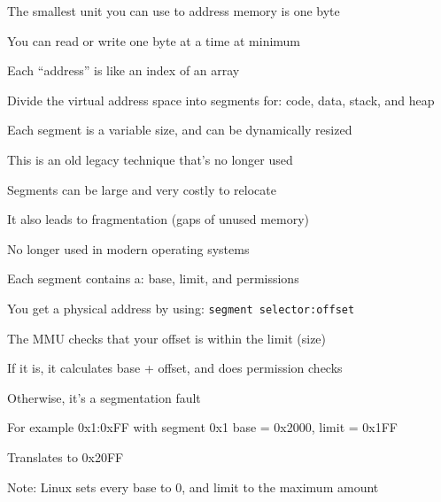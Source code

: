 \begin{slide}


    The smallest unit you can use to address memory is one byte
    \medskip

    You can read or write one byte at a time at minimum
    \medskip

    Each ``address'' is like an index of an array

\end{slide}

\begin{slide}


    Divide the virtual address space into segments for: code, data, stack, and heap


    Each segment is a variable size, and can be dynamically resized

    \leftspace{}This is an old legacy technique that's no longer used
    \medskip

    Segments can be large and very costly to relocate

    \leftspace{}It also leads to fragmentation (gaps of unused memory)
    \medskip

    No longer used in modern operating systems

\end{slide}

\begin{slide}


    Each segment contains a: base, limit, and permissions

    \leftspace{}You get a physical address by using: \texttt{segment selector:offset}
    \medskip

    The MMU checks that your offset is within the limit (size)

    \leftspace{}If it is, it calculates base + offset, and does permission checks

    \leftspace{}\leftspace{}Otherwise, it's a segmentation fault
    \medskip

    For example 0x1:0xFF with segment 0x1 base = 0x2000, limit = 0x1FF

    \leftspace{}Translates to 0x20FF
    \medskip

    Note: Linux sets every base to 0, and limit to the maximum amount

\end{slide}

